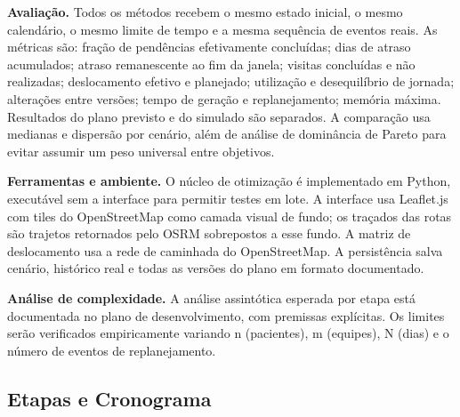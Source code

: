 \documentclass[11pt,a4paper]{article}
\begin{document}
\textbf{Avaliação.} Todos os métodos recebem o mesmo estado inicial, o
mesmo calendário, o mesmo limite de tempo e a mesma sequência de eventos
reais. As métricas são: fração de pendências efetivamente concluídas;
dias de atraso acumulados; atraso remanescente ao fim da janela; visitas
concluídas e não realizadas; deslocamento efetivo e planejado;
utilização e desequilíbrio de jornada; alterações entre versões; tempo
de geração e replanejamento; memória máxima. Resultados do plano
previsto e do simulado são separados. A comparação usa medianas e
dispersão por cenário, além de análise de dominância de Pareto para
evitar assumir um peso universal entre objetivos.

\textbf{Ferramentas e ambiente.} O núcleo de otimização é implementado
em Python, executável sem a interface para permitir testes em lote. A
interface usa Leaflet.js com tiles do OpenStreetMap como camada visual
de fundo; os traçados das rotas são trajetos retornados pelo OSRM sobrepostos
a esse fundo. A matriz de deslocamento usa a rede de caminhada do OpenStreetMap. A
persistência salva cenário, histórico real e todas as versões do plano
em formato documentado.

\textbf{Análise de complexidade.} A análise assintótica esperada por
etapa está documentada no plano de desenvolvimento, com premissas
explícitas. Os limites serão verificados empiricamente variando n
(pacientes), m (equipes), N (dias) e o número de eventos de
replanejamento.

\subsection{Etapas e Cronograma}\label{etapas-e-cronograma}
\end{document}
